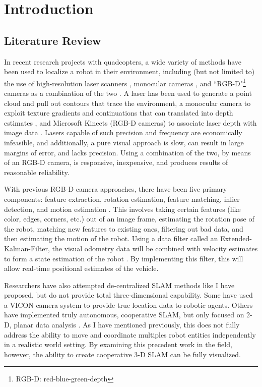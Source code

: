 \documentclass[letterpaper, oneside, 12pt]{report}
\begin{document}
\chapter{Introduction}

\section{Literature Review}

In recent research projects with quadcopters, a wide variety of methods have been used to localize a robot in their environment, including (but not limited to) the use of high-resolution laser scanners \cite{bachrach2011range,shen2011autonomous}, monocular cameras \cite{soundararaj2009autonomous}, and ``RGB-D"\footnote{RGB-D: red-blue-green-depth} cameras as a combination of the two \cite{huang2011visual}. A laser has been used to generate a point cloud and pull out contours that trace the environment\cite{bachrach2011range}, a monocular camera to exploit texture gradients and continuations that can translated into depth estimates \cite{soundararaj2009autonomous}, and Microsoft Kinects (RGB-D cameras) to associate laser depth with image data \cite{huang2011visual}. Lasers capable of such precision and frequency are economically infeasible, and additionally, a pure visual approach is slow, can result in large margins of error, and lacks precision. Using a combination of the two, by means of an RGB-D camera, is responsive,  inexpensive, and produces results of reasonable reliability.


With previous RGB-D camera approaches, there have been five primary components: feature extraction, rotation estimation, feature matching, inlier detection, and motion estimation \cite{huang2011visual}. This involves taking certain features (like color, edges, corners, etc.) out of an image frame, estimating the rotation pose of the robot, matching new features to existing ones, filtering out bad data, and then estimating the motion of the robot. Using a data filter called an Extended-Kalman-Filter, the visual odometry data will be combined with velocity estimates to form a state estimation of the robot \cite{huang2011visual}. By implementing this filter, this will allow real-time positional estimates of the vehicle.


Researchers have also attempted de-centralized SLAM methods like I have proposed, but do not provide total three-dimensional capability. Some have used a VICON camera system \cite{leung2012decentralized} to provide true location data to robotic agents. Others have implemented truly autonomous, cooperative SLAM, but only focused on 2-D, planar data analysis \cite{cunningham2012large}. As I have mentioned previously, this does not fully address the ability to move and coordinate multiples robot entities independently in a realistic world setting. By examining this precedent work in the field, however, the ability to create cooperative 3-D SLAM can be fully visualized.
\end{document}
